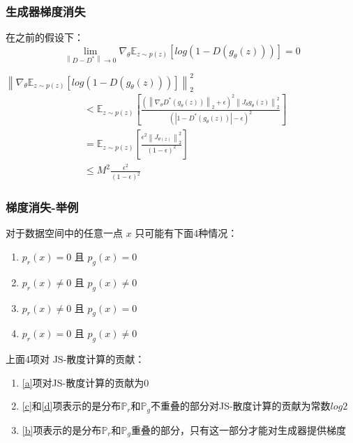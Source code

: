 \documentclass[xelatex]{beamer}
\begin{document}
\begin{frame}
\frametitle{生成器梯度消失}
\begin{theorem}
  在之前的假设下：
  $$
  \lim_{\left \| D - D^* \right \| \to 0} {\nabla}_{\theta} \mathbb{E}_{z \sim p(z)} \left [ log(1 - D(g_{\theta}(z))) \right ] = 0
  $$
\end{theorem}
\vspace{5mm}
${\left \| {\nabla}_{\theta} \mathbb{E}_{z \sim p(z)} \left [ log(1 - D(g_{\theta}(z))) \right ] \right \|}_2^2$ 
\begin{equation*}\begin{split}
& <   \mathbb{E}_{z \sim p(z)} \left [  \frac{\left ( {\left \| \nabla_{\theta}D^*(g_{\theta}(z)) \right \| }_2 + \epsilon  \right )^2 {\left \| J_{\theta}g_{\theta}(z) \right \|}_2^2}{\left ( \left | 1 - D^*(g_{\theta}(z)) \right | - \epsilon  \right  )^2} \right ]    \\
& = \mathbb{E}_{z \sim p(z)} \left [ \frac{{\epsilon }^2 \left \| J_{\theta (z)} \right \|^2_2}{\left ( 1 - \epsilon  \right )^2}  \right ]   \\
& \leq M^2 \frac{\epsilon ^ 2}{(1 - \epsilon)^2}
\end{split}\end{equation*}

\end{frame}

\begin{frame}
  \frametitle{梯度消失-举例}
  \begin{example}[分布的支撑集不重叠导致梯度消失]
    对于数据空间中的任意一点 $x$ 只可能有下面4种情况：
    \begin{enumerate}
      \item $p_{r}(x) = 0$ 且 $p_{g}(x) = 0$ \label{a}
      \item $p_{r}(x) \neq 0$ 且 $p_{g}(x) \neq 0$ \label{b}
      \item $p_{r}(x) \neq 0$ 且 $p_{g}(x) = 0$ \label{c}
      \item $p_{r}(x) = 0$ 且 $p_{g}(x) \neq 0$ \label{d}
    \end{enumerate}
  \end{example}
  上面4项对 JS-散度计算的贡献：
  \begin{enumerate}
    \item \ref{a}项对JS-散度计算的贡献为0
    \item \ref{c}和\ref{d}项表示的是分布$\mathbb{P}_r$和$\mathbb{P}_g$不重叠的部分对JS-散度计算的贡献为常数$log2$
    \item \ref{b}项表示的是分布$\mathbb{P}_r$和$\mathbb{P}_g$重叠的部分，只有这一部分才能对生成器提供梯度
  \end{enumerate}
\end{frame}
\end{document}
